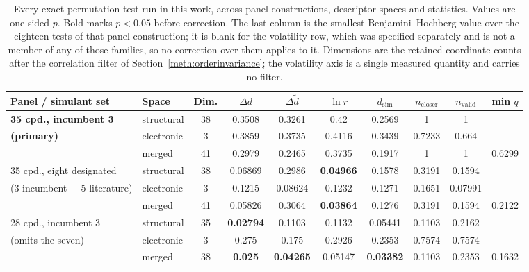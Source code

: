 \begin{table}[htb]
\centering
\caption{Every exact permutation test run in this work, across panel
constructions, descriptor spaces and statistics. Values are one-sided $p$. Bold
marks $p<0.05$ before correction. The last column is the smallest
Benjamini--Hochberg value over the eighteen tests of that panel construction;
it is blank for the volatility row, which was specified separately and is not a
member of any of those families, so no correction over them applies to it.
Dimensions are the retained coordinate counts after the correlation filter of
Section~\ref{meth:orderinvariance}; the volatility axis is a single measured
quantity and carries no filter.}
\label{tab:ablation}
\small
\setlength{\tabcolsep}{4pt}
\begin{tabular}{llcccccccc}
\hline
Panel / simulant set & Space & Dim. & $\Delta\bar{d}$ & $\Delta\tilde{d}$ &
$\overline{\ln r}$ & $\bar{d}_\mathrm{sim}$ & $n_\mathrm{closer}$ &
$n_\mathrm{valid}$ & min $q$ \\
\hline
\textbf{35 cpd., incumbent 3} & structural  & 38 & 0.3508 & 0.3261 & 0.42 & 0.2569 & 1 & 1 &  \\
\textbf{(primary)}     & electronic  &  3 & 0.3859 & 0.3735 & 0.4116 & 0.3439 & 0.7233 & 0.664 &  \\
                       & merged      & 41 & 0.2979 & 0.2465 & 0.3735 & 0.1917 & 1 & 1 & 0.6299 \\
\hline
35 cpd., eight designated & structural  & 38 & 0.06869 & 0.2986 & \textbf{0.04966} & 0.1578 & 0.3191 & 0.1594 &  \\
\quad (3 incumbent + 5 literature) & electronic  &  3 & 0.1215 & 0.08624 & 0.1232 & 0.1271 & 0.1651 & 0.07991 &  \\
                       & merged      & 41 & 0.05826 & 0.3064 & \textbf{0.03864} & 0.1276 & 0.3191 & 0.1594 & 0.2122 \\
\hline
28 cpd., incumbent 3   & structural  & 35 & \textbf{0.02794} & 0.1103 & 0.1132 & 0.05441 & 0.1103 & 0.2162 &  \\
\quad (omits the seven) & electronic  &  3 & 0.275 & 0.175 & 0.2926 & 0.2353 & 0.7574 & 0.7574 &  \\
                       & merged      & 38 & \textbf{0.025} & \textbf{0.04265} & 0.05147 & \textbf{0.03382} & 0.1103 & 0.2353 & 0.1632 \\

\end{tabular}
\end{table}
